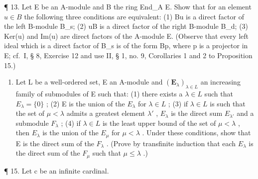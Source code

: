 ¶ 13. Let E be an A-module and B the ring End\_A E. Show that for an element \(u \in B\) the following three conditions are equivalent: (1) Bu is a direct factor of the left B-module B\_s; (2) uB is a direct factor of the right B-module B\_d; (3) Ker(u) and Im(u) are direct factors of the A-module E. (Observe that every left ideal which is a direct factor of B\_s is of the form Bp, where p is a projector in E; cf.~I, § 8, Exercise 12 and use II, § 1, no. 9, Corollaries 1 and 2 to Proposition 15.)

\begin{enumerate}
\def\labelenumi{\arabic{enumi}.}
\setcounter{enumi}{13}
\tightlist
\item
  Let L be a well-ordered set, E an A-module and \((\mathbf{E}_{\lambda})_{\lambda \in L}\) an increasing family of submodules of E such that: (1) there exists a \(\lambda \in L\) such that \(E_{\lambda} = \{0\}\) ; (2) E is the union of the \(E_{\lambda}\) for \(\lambda \in L\) ; (3) if \(\lambda \in L\) is such that the set of \(\mu < \lambda\) admits a greatest element \(\lambda'\) , \(E_{\lambda}\) is the direct sum \(E_{\lambda'}\) and a submodule \(F_{\lambda}\) ; (4) if \(\lambda \in L\) is the least upper bound of the set of \(\mu < \lambda\) , then \(E_{\lambda}\) is the union of the \(E_{\mu}\) for \(\mu < \lambda\) . Under these conditions, show that E is the direct sum of the \(F_{\lambda}\) . (Prove by transfinite induction that each \(E_{\lambda}\) is the direct sum of the \(F_{\mu}\) such that \(\mu \leqslant \lambda\) .)
\end{enumerate}

¶ 15. Let c be an infinite cardinal.

